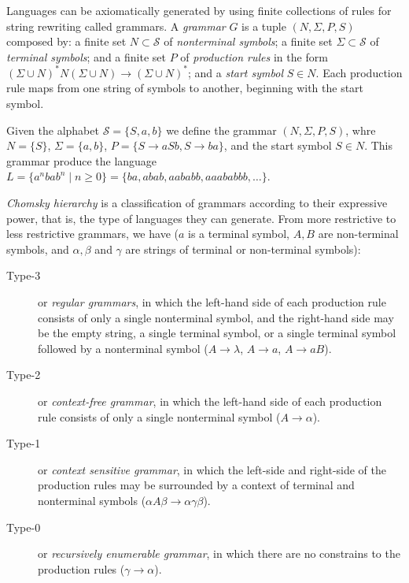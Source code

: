 Languages can be axiomatically generated by using finite collections of rules for string rewriting called grammars. A \emph{grammar} $G$ is a tuple $(N, \Sigma, P, S)$ composed by: a finite set $N \subset \mathcal{S}$ of \emph{nonterminal symbols}; a finite set $\Sigma \subset \mathcal{S}$ of \emph{terminal symbols}; and a finite set $P$ of \emph{production rules} in the form $( \Sigma \cup N )^\ast N ( \Sigma \cup N) \rightarrow (\Sigma \cup N)^\ast$; and a \emph{start symbol} $S \in N$. Each production rule maps from one string of symbols to another, beginning with the start symbol.

\begin{example}
\label{ex:context_free_grammar}
Given the alphabet $\mathcal{S} = \{ S, a, b \}$ we define the grammar $(N, \Sigma, P, S)$, whre $N = \{ S \}$, $\Sigma = \{ a, b \}$, $P = \{ S \rightarrow aSb, S \rightarrow ba \}$, and the start symbol $S \in N$. This grammar produce the language $L = \{ a^nbab^n \mid n\geq0 \} = \{ ba, abab, aababb, aaababbb, \ldots \}$.
\end{example}

\emph{Chomsky hierarchy} is a classification of grammars according to their expressive power, that is, the type of languages they can generate. From more restrictive to less restrictive grammars, we have ($a$ is a terminal symbol, $A, B$ are non-terminal symbols, and $\alpha, \beta$ and $\gamma$ are strings of terminal or non-terminal symbols):

\begin{description}
\item[Type-3] or \emph{regular grammars}, in which the left-hand side of each production rule consists of only a single nonterminal symbol, and the right-hand side may be the empty string, a single terminal symbol, or a single terminal symbol followed by a nonterminal symbol ($A \rightarrow \lambda$, $A \rightarrow a$, $A \rightarrow aB$).

\item[Type-2] or \emph{context-free grammar}, in which the left-hand side of each production rule consists of only a single nonterminal symbol ($A \rightarrow \alpha$). 

\item[Type-1] or \emph{context sensitive grammar}, in which the left-side and right-side of the production rules may be surrounded by a context of terminal and nonterminal symbols ($\alpha A \beta \rightarrow \alpha \gamma \beta$).

\item[Type-0] or \emph{recursively enumerable grammar}, in which there are no constrains to the production rules ($\gamma \rightarrow \alpha$).
\end{description}

